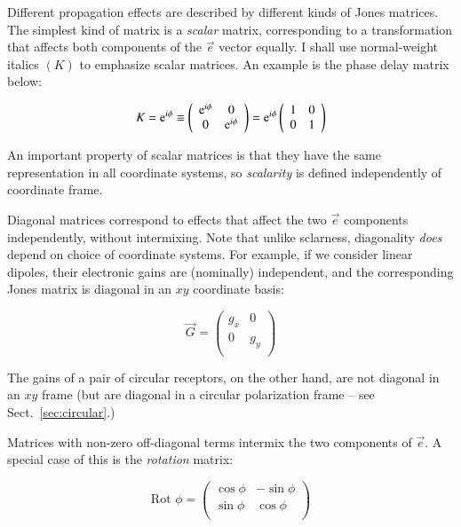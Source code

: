\documentclass[]{aa}
\newcommand{\jones}[2]{\vec {#1}_{#2}}
\begin{document}
Different propagation effects are described by different kinds of Jones matrices. The simplest kind of matrix is a {\em scalar} matrix, corresponding to a transformation that affects both components of the $\vec e$ vector equally. I shall use normal-weight italics $(K)$ to emphasize scalar matrices. An example is the phase delay matrix below:

    \[
    K = {\rm e}^{i\phi} \equiv 
    \left( 
    \begin{array}{cc}
    {\rm e}^{i\phi} & 0 \\
    0 & {\rm e}^{i\phi} \\
    \end{array}
    \right) =   
    {\rm e}^{i\phi} \left( 
    \begin{array}{cc}
    1 & 0 \\
    0 & 1 \\
    \end{array}
    \right)    
    \]

An important property of scalar matrices is that they have the same representation in all coordinate systems, so {\em scalarity} is defined independently of coordinate frame.

Diagonal matrices correspond to effects that affect the two $\vec e$ components independently, without intermixing. Note that unlike sclarness, diagonality {\em does} depend on choice of coordinate systems. For example, if we consider linear dipoles, their electronic gains are (nominally) independent, and the corresponding Jones matrix is diagonal in an $xy$ coordinate basis:

    \[
    \jones{G}{} = 
    \left( 
    \begin{array}{cc}
    g_x & 0 \\
    0 & g_y \\
    \end{array}
    \right) 
    \]

The gains of a pair of circular receptors, on the other hand, are not diagonal in an $xy$ frame (but are diagonal in a circular polarization frame -- see Sect.~\ref{sec:circular}.)

Matrices with non-zero off-diagonal terms intermix the two components of $\vec e$. A special case of this is the {\em rotation} matrix:

    \[
    \mbox{Rot~}\phi = 
    \left( 
    \begin{array}{cc}
    \cos\phi & -\sin\phi \\
    \sin\phi & \cos\phi \\
    \end{array}
    \right) 
    \]
\end{document}
